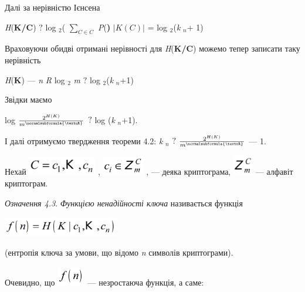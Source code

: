 Далі за нерівністю Ієнсена

{\centering
\textit{H}(\textbf{K}\textbf{/}\textbf{C})   $?$ log ${}_2$(
$\underset{C\in C}{\sum }$ \textit{P}(\textitC\textbf{) } $|K(C)|$ = 
log ${}_2$(\textit{k} ${}_n$+ 1) $ $
\par}

Враховуючи обидві отримані нерівності для 
\textit{H}(\textbf{K}\textbf{/}\textbf{C}) можемо тепер записати таку
нерівність 

{\centering
\textit{H}(\textbf{K}) --- \textit{n}\textit{ }\textit{R} log ${}_2$
\textit{m}   $?$  log ${}_2$(\textit{k} ${}_n$+1)
\par}

Звідки  маємо

{\centering
log  $\frac{2^{H(K)}}{m^{\normalsubformula{\textnR}}}$   $?$  log
(\textit{k} ${}_n$+1).
\par}

І  далі отримуємо твердження теореми 4.2:  \textit{k} ${}_n$   $?$  
$\frac{2^{H(K)}}{m^{\normalsubformula{\textnR}}}$  --- 1. 

Нехай 
\includegraphics[width=1.1764in,height=0.3327in]{crypt-img/crypt-img38.png} ,  
\includegraphics[width=0.7201in,height=0.3472in]{crypt-img/crypt-img39.png} , ---
деяка криптограма, 
\includegraphics[width=0.3465in,height=0.3465in]{crypt-img/crypt-img40.png}  ---
алфавіт криптограм.

\textit{Означення 4.3}. \textit{Функцією ненадійності ключа} називається 
функція 

{\centering 
\includegraphics[width=1.9882in,height=0.3346in]{crypt-img/crypt-img41.png}
\par}

(ентропія ключа за умови, що відомо \textit{n }символів криптограми).

Очевидно, що 
\includegraphics[width=0.4874in,height=0.3354in]{crypt-img/crypt-img42.png}  ---
незростаюча функція, а саме:

